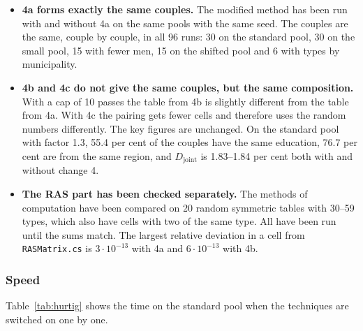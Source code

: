 \documentclass[12pt,a4paper]{article}
\newcommand{\kode}[1]{\texttt{#1}}
\begin{document}
\begin{itemize}
\item \textbf{4a forms exactly the same couples.} The modified method has been run with and without
4a on the same pools with the same seed. The couples are the same, couple by couple, in all 96
runs: 30 on the standard pool, 30 on the small pool, 15 with fewer men, 15 on the shifted pool and
6 with types by municipality.
\item \textbf{4b and 4c do not give the same couples, but the same composition.} With a cap of 10
passes the table from 4b is slightly different from the table from 4a. With 4c the pairing gets
fewer cells and therefore uses the random numbers differently. The key figures are unchanged. On
the standard pool with factor 1.3, 55.4 per cent of the couples have the same education, 76.7 per
cent are from the same region, and $D_{\text{joint}}$ is 1.83--1.84 per cent both with and without
change 4.
\item \textbf{The RAS part has been checked separately.} The methods of computation have been
compared on 20 random symmetric tables with 30--59 types, which also have cells with two of the
same type. All have been run until the sums match. The largest relative deviation in a cell from
\kode{RASMatrix.cs} is $3\cdot10^{-13}$ with 4a and $6\cdot10^{-13}$ with 4b.
\end{itemize}

\subsubsection*{Speed}

Table~\ref{tab:hurtig} shows the time on the standard pool when the techniques are switched on one
by one.
\end{document}
